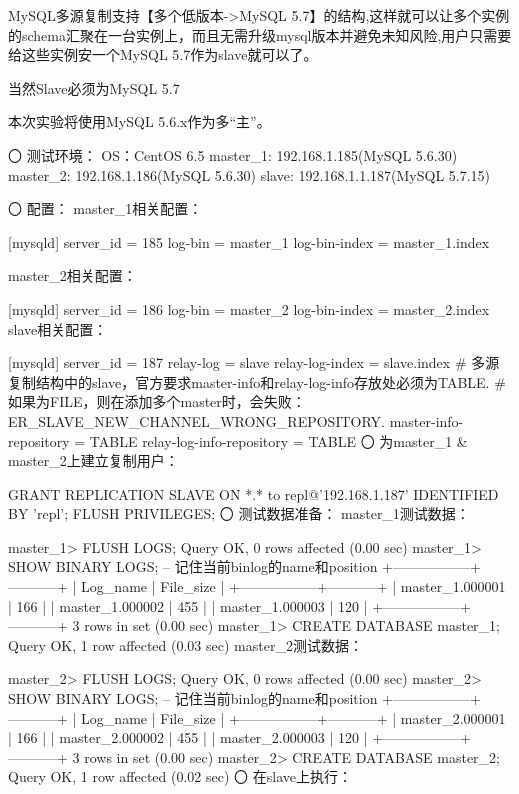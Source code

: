 MySQL多源复制支持【多个低版本->MySQL 5.7】的结构,这样就可以让多个实例的schema汇聚在一台实例上，而且无需升级mysql版本并避免未知风险,用户只需要给这些实例安一个MySQL 5.7作为slave就可以了。

当然Slave必须为MySQL 5.7


本次实验将使用MySQL 5.6.x作为多“主”。

〇 测试环境：
OS：CentOS 6.5
master_1: 192.168.1.185(MySQL 5.6.30)
master_2: 192.168.1.186(MySQL 5.6.30)
slave: 192.168.1.1.187(MySQL 5.7.15)


〇 配置：
master_1相关配置：

[mysqld]
server_id    = 185
log-bin      = master_1
log-bin-index    = master_1.index

master_2相关配置：

[mysqld]
server_id    = 186
log-bin      = master_2
log-bin-index    = master_2.index
slave相关配置：

[mysqld]
server_id    = 187
relay-log    = slave
relay-log-index           = slave.index
# 多源复制结构中的slave，官方要求master-info和relay-log-info存放处必须为TABLE.
# 如果为FILE，则在添加多个master时，会失败：ER_SLAVE_NEW_CHANNEL_WRONG_REPOSITORY.
master-info-repository    = TABLE
relay-log-info-repository = TABLE
〇 为master_1 & master_2上建立复制用户：

GRANT REPLICATION SLAVE ON *.* to repl@'192.168.1.187' IDENTIFIED BY 'repl';
FLUSH PRIVILEGES;
〇 测试数据准备：
master_1测试数据：

master_1> FLUSH LOGS;
Query OK, 0 rows affected (0.00 sec)
master_1> SHOW BINARY LOGS; -- 记住当前binlog的name和position
+-----------------+-----------+
| Log_name        | File_size |
+-----------------+-----------+
| master_1.000001 | 166       |
| master_1.000002 | 455       |
| master_1.000003 | 120       |
+-----------------+-----------+
3 rows in set (0.00 sec)
master_1> CREATE DATABASE master_1;
Query OK, 1 row affected (0.03 sec)
master_2测试数据：

master_2> FLUSH LOGS;
Query OK, 0 rows affected (0.00 sec)
master_2> SHOW BINARY LOGS;    -- 记住当前binlog的name和position
+-----------------+-----------+
| Log_name       | File_size |
+-----------------+-----------+
| master_2.000001 | 166       |
| master_2.000002 | 455       |
| master_2.000003 | 120       |
+-----------------+-----------+
3 rows in set (0.00 sec)
master_2> CREATE DATABASE master_2;
Query OK, 1 row affected (0.02 sec)
〇 在slave上执行：

